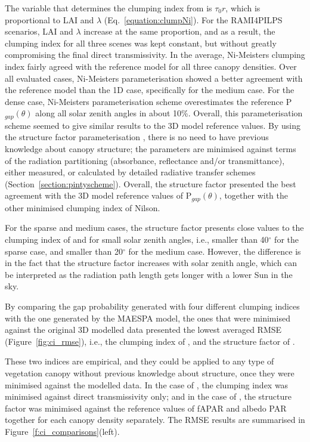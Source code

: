 \documentclass[a4paper,11pt]{report}
\begin{document}
The variable that determines the clumping index from \citet{Ni-Meister2010} is $\tau_0r$, which is proportional to LAI and $\lambda$ (Eq.~\ref{equation:clumpNi}). For the RAMI4PILPS scenarios, LAI and $\lambda$ increase at the same proportion, and as a result, the clumping index for all three scenes was kept constant, but without greatly compromising the final direct transmissivity. In the average, Ni-Meister\textsinglequote s clumping index fairly agreed with the reference model for all three canopy densities. Over all evaluated cases, Ni-Meister\textquotesingle s parameterisation showed a better agreement with the reference model than the 1D case, specifically for the medium case. For the dense case, Ni-Meister\textquotesingle s parameterisation scheme overestimates the reference P$_{gap}(\theta)$ along all solar zenith angles in about 10\%. Overall, this parameterisation scheme seemed to give similar results to the 3D model reference values. By using the structure factor parameterisation \citep{pinty2006}, there is no need to have previous knowledge about canopy structure; the parameters are minimised against terms of the radiation partitioning (absorbance, reflectance and/or transmittance), either measured, or calculated by detailed radiative transfer schemes (Section~\ref{section:pintyscheme}). Overall, the structure factor presented the best agreement with the 3D model reference values of P$_{gap}(\theta)$, together with the other minimised clumping index of Nilson.

For the sparse and medium cases, the structure factor presents close values to the clumping index of \citet{Nilson1971} and \citet{Ni-Meister2010} for small solar zenith angles, i.e., smaller than 40$^{\circ}$ for the sparse case, and smaller than 20$^{\circ}$ for the medium case. However, the difference is in the fact that the structure factor increases with solar zenith angle, which can be interpreted as the radiation path length gets longer with a lower Sun in the sky.

By comparing the gap probability generated with four different clumping indices with the one generated by the MAESPA model, the ones that were minimised against the original 3D modelled data presented the lowest averaged RMSE (Figure~\ref{fig:ci_rmse}), i.e., the clumping index of \citet{Nilson1971}, and the structure factor of \citet{pinty2006}. 

These two indices are empirical, and they could be applied to any type of vegetation canopy without previous knowledge about structure, once they were minimised against the modelled data. In the case of \citet{Nilson1971}, the clumping index was minimised against direct transmissivity only; and in the case of \citet{pinty2006}, the structure factor was minimised against the reference values of fAPAR and albedo PAR together for each canopy density separately. The RMSE results are summarised in Figure~\ref{f:ci_comparisons}(left).
\end{document}
